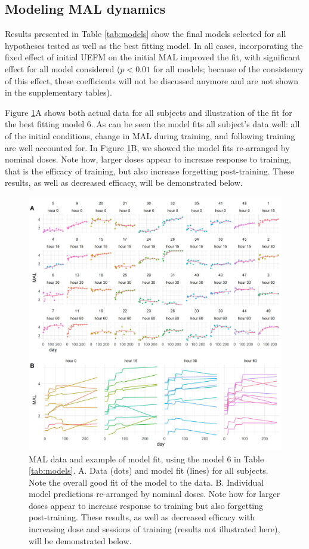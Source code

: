 \subsection{Modeling MAL dynamics}
Results presented in Table \ref{tab:models} show the final models selected for all hypotheses tested as well as the best fitting model. 
In all cases, incorporating the fixed effect of initial UEFM on the initial MAL improved the fit, with significant effect for all model considered ($ p < 0.01 $ for all models; because of the consistency of this effect, these coefficients will not be discussed anymore and are not shown in the supplementary tables).

Figure \ref{fig:dosebest}A shows both actual data for all subjects and illustration of the fit for the best fitting model 6. 
As can be seen the model fits all subject’s data well: all of the initial conditions, change in MAL during training, and following training are well accounted for. 
In Figure \ref{fig:dosebest}B, we showed the model fits re-arranged by nominal doses. 
Note how, larger doses appear to increase response to training, that is the efficacy of training, but also increase forgetting post-training. 
These results, as well as decreased efficacy, will be demonstrated below.

\begin{figure}
	\centering
	\includegraphics[width=\linewidth]{figures/doseBest}
	\caption[MAL data and example of model fit, using the model 6 in Table \ref{tab:models}.]{
		MAL data and example of model fit, using the model 6 in Table \ref{tab:models}. 
		A. Data (dots) and model fit (lines) for all subjects. Note the overall good fit of the model to the data. 
		B. Individual model predictions re-arranged by nominal doses. Note how for larger doses appear to increase response to training but also forgetting post-training. These results, as well as decreased efficacy with increasing dose and sessions of training (results not illustrated here), will be demonstrated below.}
	\label{fig:dosebest}
\end{figure}


